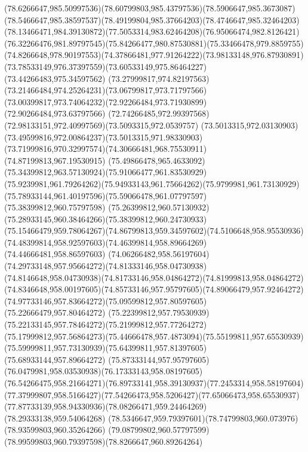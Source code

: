 {{	\curveto(78.6266647,985.50997536)(78.60799803,985.43797536)(78.5906647,985.3673087)
	\curveto(78.5466647,985.38597537)(78.49199804,985.37664203)(78.4746647,985.32464203)
	\curveto(78.13466471,984.39130872)(77.5053314,983.62464208)(76.95066474,982.8126421)
	\curveto(76.32266476,981.89797545)(75.84266477,980.87530881)(75.33466478,979.8859755)
	\curveto(74.8266648,978.90197553)(74.37866481,977.91264222)(73.98133148,976.87930891)
	\curveto(73.78533149,976.37397559)(73.60533149,975.86464227)(73.44266483,975.34597562)
	\curveto(73.27999817,974.82197563)(73.21466484,974.25264231)(73.06799817,973.71797566)
	\curveto(73.00399817,973.74064232)(72.92266484,973.71930899)(72.90266484,973.63797566)
	\curveto(72.74266485,972.99397568)(72.98133151,972.40997569)(73.5093315,972.0539757)
	\curveto(73.5013315,972.03130903)(73.49599816,972.00864237)(73.5013315,971.98330903)
	\curveto(73.71999816,970.32997574)(74.30666481,968.75530911)(74.87199813,967.19530915)
	\curveto(75.49866478,965.4633092)(75.34399812,963.57130924)(75.91066477,961.83530929)
	\curveto(75.9239981,961.79264262)(75.94933143,961.75664262)(75.9799981,961.73130929)
	\curveto(75.78933144,961.40197596)(75.59066478,961.07797597)(75.38399812,960.75797598)
	\curveto(75.26399812,960.57130932)(75.28933145,960.38464266)(75.38399812,960.24730933)
	\curveto(75.15466479,959.78064267)(74.86799813,959.34597602)(74.5106648,958.95530936)
	\curveto(74.48399814,958.92597603)(74.46399814,958.89664269)(74.44666481,958.86597603)
	\curveto(74.06266482,958.56197604)(74.29733148,957.95664272)(74.81333146,958.04730938)
	\curveto(74.8146648,958.04730938)(74.81733146,958.04864272)(74.81999813,958.04864272)
	\curveto(74.8346648,958.00197605)(74.85733146,957.95797605)(74.89066479,957.92464272)
	\curveto(74.97733146,957.83664272)(75.09599812,957.80597605)(75.22666479,957.80464272)
	\curveto(75.22399812,957.79530939)(75.22133145,957.78464272)(75.21999812,957.77264272)
	\curveto(75.17999812,957.56864273)(75.44666478,957.4873094)(75.55199811,957.65530939)
	\curveto(75.59999811,957.73130939)(75.64399811,957.81397605)(75.68933144,957.89664272)
	\curveto(75.87333144,957.95797605)(76.0479981,958.03530938)(76.17333143,958.08197605)
	\curveto(76.54266475,958.21664271)(76.89733141,958.39130937)(77.2453314,958.58197604)
	\curveto(77.37999807,958.5166427)(77.54266473,958.5206427)(77.65066473,958.65530937)
	\curveto(77.87733139,958.94330936)(78.08266471,959.24464269)(78.29333138,959.54064268)
	\curveto(78.5346647,959.79397601)(78.74799803,960.073976)(78.93599803,960.35264266)
	\curveto(79.08799802,960.57797599)(78.99599803,960.79397598)(78.8266647,960.89264264)
}}
